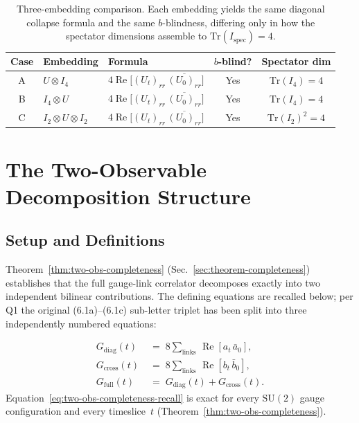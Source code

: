 \documentclass[12pt]{article}
\numberwithin{equation}{section}
\theoremstyle{plain}
\theoremstyle{definition}
\theoremstyle{remark}
\newcommand{\su}{\mathrm{SU}}              %
\newcommand{\tr}{\mathrm{Tr}}              %
\newcommand{\Gdiag}{G_{\mathrm{diag}}}     %
\newcommand{\Gcross}{G_{\mathrm{cross}}}   %
\newcommand{\Gfull}{G_{\mathrm{full}}}     %
\begin{document}
	\begin{table}[ht]
		\centering
		\caption{Three-embedding comparison.  Each embedding yields the
			same diagonal collapse formula and the same $b$-blindness,
			differing only in how the spectator dimensions assemble to
			$\tr(I_{\mathrm{spec}}) = 4$.}
		\label{tab:three-embedding}
		\small
		\setlength{\tabcolsep}{6pt}
		\begin{tabular}{@{}cllcc@{}}
			\toprule
			\textbf{Case} & \textbf{Embedding} & \textbf{Formula}
			& \textbf{$b$-blind?} & \textbf{Spectator dim}\\
			\midrule
			A & $U\otimes I_{4}$
			& $4\operatorname{Re}\!\bigl[(U_t)_{rr}\,
			\overline{(U_0)_{rr}}\bigr]$
			& Yes & $\tr(I_{4}) = 4$\\
			B & $I_{4}\otimes U$
			& $4\operatorname{Re}\!\bigl[(U_t)_{rr}\,
			\overline{(U_0)_{rr}}\bigr]$
			& Yes & $\tr(I_{4}) = 4$\\
			C & $I_{2}\otimes U\otimes I_{2}$
			& $4\operatorname{Re}\!\bigl[(U_t)_{rr}\,
			\overline{(U_0)_{rr}}\bigr]$
			& Yes & $\tr(I_{2})^{2} = 4$\\
			\bottomrule
		\end{tabular}
	\end{table}
	
	\section{The Two-Observable Decomposition Structure}
	\label{sec:two-obs-structure}
	
	\subsection{Setup and Definitions}
	\label{sec:setup}
	
	Theorem~\ref{thm:two-obs-completeness} (Sec.~\ref{sec:theorem-completeness})
	establishes that the full gauge-link correlator decomposes exactly into
	two independent bilinear contributions.  The defining equations are
	recalled below; per Q1 the original (6.1a)--(6.1c) sub-letter triplet
	has been split into three independently numbered equations:
	
	\begin{align}
		\Gdiag(t)  &\;=\; 8\!\sum_{\mathrm{links}}\,
		\operatorname{Re}[a_t\,\bar{a}_0],
		\label{eq:Gdiag-def-recall}\\[2pt]
		\Gcross(t) &\;=\; 8\!\sum_{\mathrm{links}}\,
		\operatorname{Re}[b_t\,\bar{b}_0],
		\label{eq:Gcross-def-recall}\\[2pt]
		\Gfull(t)  &\;=\; \Gdiag(t) + \Gcross(t).
		\label{eq:two-obs-completeness-recall}
	\end{align}
	Equation~\eqref{eq:two-obs-completeness-recall} is exact for every
	$\su(2)$ gauge configuration and every timeslice~$t$
	(Theorem~\ref{thm:two-obs-completeness}).
	
\end{document}
